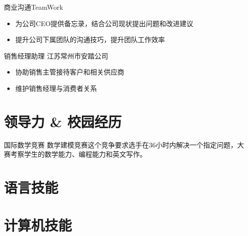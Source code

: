 \documentclass[11pt,a4paper]{moderncv}
\begin{document}
{商业沟通TeamWork}
{}
{}{}
{\begin{itemize}
\item 为公司CEO提供备忘录，结合公司现状提出问题和改进建议
\item 提升公司下属团队的沟通技巧，提升团队工作效率
\end{itemize}
}

{销售经理助理}
{江苏常州市安踏公司}
{}{}
{
\begin{itemize}
\item 协助销售主管接待客户和相关供应商 
\item 维护销售经理与消费者关系
\end{itemize}
}

\section{领导力 \& 校园经历} %
{国际数学竞赛}{}{}{}{}
{数学建模竞赛}{}{}{}{这个竞争要求选手在36小时内解决一个指定问题，大赛考察学生的数学能力、编程能力和英文写作。}

\section{语言技能}

\section{计算机技能}

\closesection{}                   %
\renewcommand{\listitemsymbol}{-} %
\end{document}
